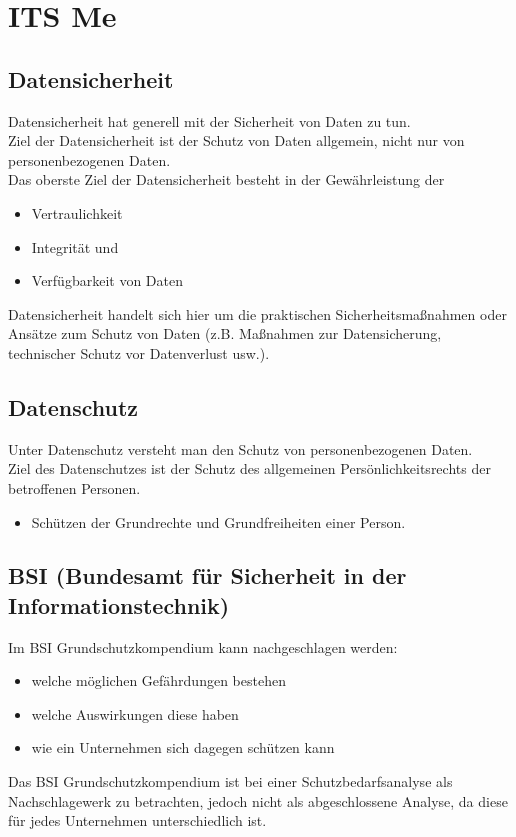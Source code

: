 \documentclass[asp1.tex]{subfiles}
\begin{document}
\section{ITS Me}
\subsection{Datensicherheit}

Datensicherheit hat generell mit der Sicherheit von Daten zu tun. \\
Ziel der Datensicherheit ist der Schutz von Daten allgemein, nicht nur von personenbezogenen Daten. \\
Das oberste Ziel der Datensicherheit besteht in der Gewährleistung der

\begin{itemize}

    \item Vertraulichkeit
    \item Integrität und
    \item Verfügbarkeit von Daten

\end{itemize}
Datensicherheit handelt sich hier um die praktischen Sicherheitsmaßnahmen oder Ansätze zum Schutz von Daten (z.B. Maßnahmen zur Datensicherung, technischer Schutz vor Datenverlust usw.).


\subsection{Datenschutz}

Unter Datenschutz versteht man den Schutz von personenbezogenen Daten. \\
Ziel des Datenschutzes ist der Schutz des allgemeinen Persönlichkeitsrechts der betroffenen Personen. \\
\begin{itemize}

    \item Schützen der Grundrechte und Grundfreiheiten einer Person.

\end{itemize}

\subsection{BSI (Bundesamt für Sicherheit in der Informationstechnik)}

Im BSI Grundschutzkompendium kann nachgeschlagen werden:
\begin{itemize}
    \item welche möglichen Gefährdungen bestehen
    \item welche Auswirkungen diese haben
    \item wie ein Unternehmen sich dagegen schützen kann
\end{itemize}
Das BSI Grundschutzkompendium ist bei einer Schutzbedarfsanalyse als Nachschlagewerk zu betrachten, jedoch nicht als abgeschlossene Analyse, da diese für jedes Unternehmen unterschiedlich ist.
\end{document}
